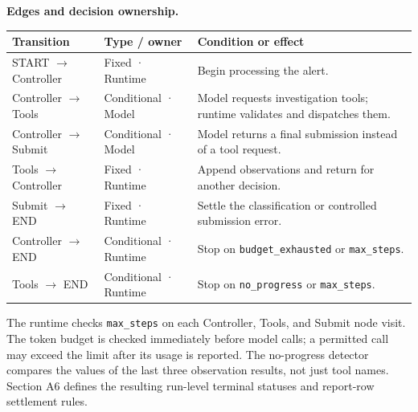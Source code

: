 \documentclass[11pt]{article}
\begin{document}
\medskip
\noindent\textbf{Edges and decision ownership.}
\par\smallskip
\begingroup
\small
\renewcommand{\arraystretch}{1.42}
\setlength{\tabcolsep}{5pt}
\noindent\begin{tabular}{@{}>{\raggedright\arraybackslash}p{.25\linewidth} >{\raggedright\arraybackslash}p{.23\linewidth} >{\raggedright\arraybackslash}p{.46\linewidth}@{}}
\toprule
\textbf{Transition} & \textbf{Type / owner} & \textbf{Condition or effect} \\
\midrule
START $\to$ Controller & Fixed · Runtime & Begin processing the alert. \\
\addlinespace[3pt]
Controller $\to$ Tools & Conditional · Model & Model requests investigation tools; runtime validates and dispatches them. \\
\addlinespace[3pt]
Controller $\to$ Submit & Conditional · Model & Model returns a final submission instead of a tool request. \\
\addlinespace[3pt]
Tools $\to$ Controller & Fixed · Runtime & Append observations and return for another decision. \\
\addlinespace[3pt]
Submit $\to$ END & Fixed · Runtime & Settle the classification or controlled submission error. \\
\addlinespace[3pt]
Controller $\to$ END & Conditional · Runtime & Stop on \texttt{budget\_exhausted} or \texttt{max\_steps}. \\
\addlinespace[3pt]
Tools $\to$ END & Conditional · Runtime & Stop on \texttt{no\_progress} or \texttt{max\_steps}. \\
\bottomrule
\end{tabular}
\endgroup
\par\vspace{12pt}
\noindent The runtime checks \texttt{max\_steps} on each Controller, Tools, and Submit node visit. The token budget is checked immediately before model calls; a permitted call may exceed the limit after its usage is reported. The no-progress detector compares the values of the last three observation results, not just tool names. Section A6 defines the resulting run-level terminal statuses and report-row settlement rules.
\end{document}
